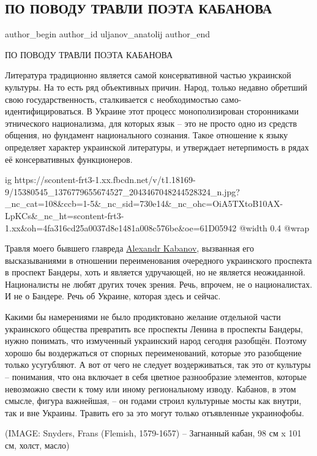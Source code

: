  
 
 
 
 
 
\subsection{ПО ПОВОДУ ТРАВЛИ ПОЭТА КАБАНОВА}
\label{sec:12_12_2016.fb.uljanov_anatolij.1.travlja_kabanov}
 
\ifcmt
 author_begin
   author_id uljanov_anatolij
 author_end
\fi

ПО ПОВОДУ ТРАВЛИ ПОЭТА КАБАНОВА

Литература традиционно является самой консервативной частью украинской
культуры. На то есть ряд объективных причин. Народ, только недавно обретший
свою государственность, сталкивается с необходимостью само-идентифицироваться.
В Украине этот процесс монополизирован сторонниками этнического национализма,
для которых язык – это не просто одно из средств общения, но фундамент
национального сознания. Такое отношение к языку определяет характер украинской
литературы, и утверждает нетерпимость в рядах её консервативных функционеров. 

\ifcmt
  ig https://scontent-frt3-1.xx.fbcdn.net/v/t1.18169-9/15380545_1376779655674527_2043467048244528324_n.jpg?_nc_cat=108&ccb=1-5&_nc_sid=730e14&_nc_ohc=OiA5TXtoB10AX-LpKCs&_nc_ht=scontent-frt3-1.xx&oh=4fa316cd25a0037d8e1481a008c576be&oe=61D05942
  @width 0.4
  @wrap 
\fi

Травля моего бывшего главреда
\href{https://www.facebook.com/kabanovsho}{Alexandr Kabanov}, вызванная его
высказываниями в отношении переименования очередного украинского проспекта в
проспект Бандеры, хоть и является удручающей, но не является неожиданной.
Националисты не любят других точек зрения. Речь, впрочем, не о националистах. И
не о Бандере. Речь об Украине, которая здесь и сейчас. 

Какими бы намерениями не было продиктовано желание отдельной части украинского
общества превратить все проспекты Ленина в проспекты Бандеры, нужно понимать,
что измученный украинский народ сегодня разобщён. Поэтому хорошо бы
воздержаться от спорных переименований, которые это разобщение только
усугубляют. А вот от чего не следует воздерживаться, так это от культуры –
понимания, что она включает в себя цветное разнообразие элементов, которые
невозможно свести к тому или иному региональному изводу.  Кабанов, в этом
смысле, фигура важнейшая, – он годами строил культурные мосты как внутри, так и
вне Украины. Травить его за это могут только отъявленные украинофобы.

(IMAGE: Snyders, Frans (Flemish, 1579-1657) – Загнанный кабан, 98 см x 101 см,
холст, масло)

